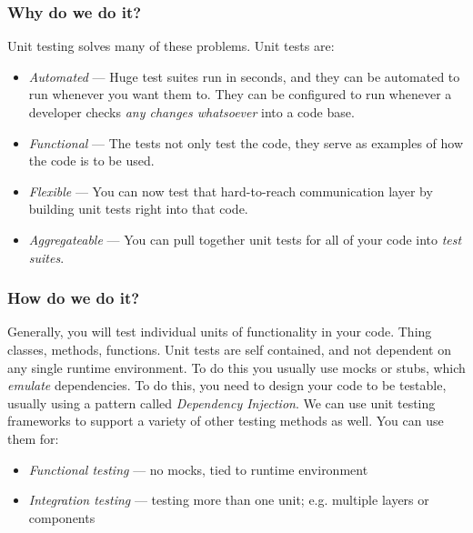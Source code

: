 \documentclass[t, 10pt]{beamer}
\begin{document}
\begin{frame}
\frametitle{Why do we do it?}
Unit testing solves many of these problems.  Unit tests are:
\begin{itemize}
\item \textit{Automated} --- Huge test suites run in seconds, and they can be automated to run whenever you want them to.  They can be configured to run whenever a developer checks \textit{any changes whatsoever} into a code base.
\item \textit{Functional} --- The tests not only test the code, they serve as examples of how the code is to be used.
\item \textit{Flexible} --- You can now test that hard-to-reach communication layer by building unit tests right into that code.
\item \textit{Aggregateable} --- You can pull together unit tests for all of your code into \textit{test suites}.
\end{itemize}
\end{frame}

\begin{frame}
\frametitle{How do we do it?}
Generally, you will test individual units of functionality in your code.  Thing classes, methods, functions.  Unit tests are self contained, and not dependent on any single runtime environment.  To do this you usually use mocks or stubs, which \textit{emulate} dependencies.  To do this, you need to design your code to be testable, usually using a pattern called \textit{Dependency Injection}.
\newline
\newline
\pause
We can use unit testing frameworks to support a variety of other testing methods as well.  You can use them for:
\begin{itemize}
\item \textit{Functional testing} --- no mocks, tied to runtime environment
\item \textit{Integration testing} --- testing more than one unit; e.g. multiple layers or components
\end{itemize}
\end{frame}
\end{document}

